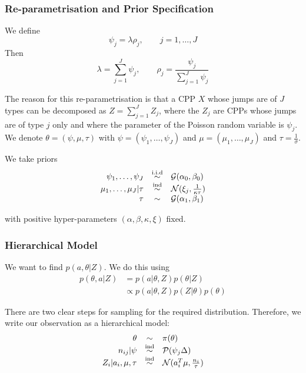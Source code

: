 \documentclass[a4paper,11pt]{article}
\theoremstyle{theorem}
\theoremstyle{definition}
\begin{document}
\subsubsection{Re-parametrisation and Prior Specification}

We define
\[
\psi_j = \lambda \rho_j, \qquad j = 1, \dotsc, J
\]
Then
\[
\lambda = \sum_{j=1}^{J}{\psi_j}, \qquad \rho_j = \frac{\psi_j}{\sum_{j=1}^{J}{\psi_j}}
\]

The reason for this re-parametrisation is that a CPP $X$ whose jumps are of $J$ types can be decomposed as $Z = \sum_{j=1}^{J}{Z_j}$, where the $Z_j$ are CPPs whose jumps are of type $j$ only and where the parameter of the Poisson random variable is $\psi_j$.
We denote $\theta = (\psi, \mu, \tau)$ with $\psi = (\psi_1, \dotsc, \psi_J)$ and $\mu = (\mu_1, \dotsc, \mu_J)$ and $\tau = \frac{1}{\sigma}$.

We take priors
\[
\begin{array}{r c l}
\psi_1, \dotsc, \psi_J & \overset{\text{i.i.d}}{\sim} & \mathcal{G}(\alpha_0, \beta_0) \\
\mu_1, \dotsc, \mu_J | \tau & \overset{\text{ind}}{\sim} & \mathcal{N}(\xi_j, \frac{1}{\kappa\tau}) \\
\tau & \sim & \mathcal{G}(\alpha_1, \beta_1)
\end{array}
\]

with positive hyper-parameters $(\alpha, \beta, \kappa, \xi)$ fixed.

\subsubsection{Hierarchical Model}

We want to find $p(a, \theta | Z)$. We do this using 
\begin{align*}
p(\theta, a | Z) &= p(a | \theta, Z)p(\theta | Z) \\
&\propto p(a | \theta, Z)p(Z | \theta)p(\theta)
\end{align*}

There are two clear steps for sampling for the required distribution. Therefore, we write our observation as a hierarchical model:
\[
\begin{array}{r c l}
\theta & \sim & \pi(\theta) \\
n_{ij} | \psi & \overset{\text{ind}}{\sim} & \mathcal{P}(\psi_j \Delta) \\
Z_i | a_i, \mu, \tau & \overset{\text{ind}}{\sim} & \mathcal{N}(a_{i}^{T} \mu, \frac{n_i}{\tau})
\end{array}
\]
\end{document}
